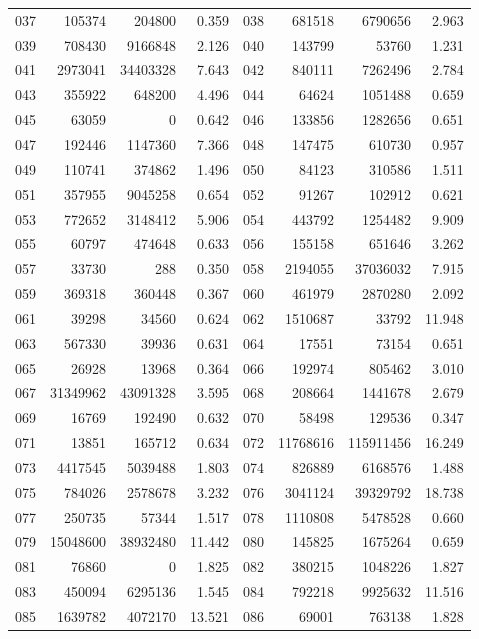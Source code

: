 \begin{longtable}{lrrr@{\hspace{16bp}}lrrr}
037 & 105374 & 204800 & 0.359 & 038 & 681518 & 6790656 & 2.963\\
039 & 708430 & 9166848 & 2.126 & 040 & 143799 & 53760 & 1.231\\
041 & 2973041 & 34403328 & 7.643 & 042 & 840111 & 7262496 & 2.784\\
043 & 355922 & 648200 & 4.496 & 044 & 64624 & 1051488 & 0.659\\
045 & 63059 & 0 & 0.642 & 046 & 133856 & 1282656 & 0.651\\
047 & 192446 & 1147360 & 7.366 & 048 & 147475 & 610730 & 0.957\\
049 & 110741 & 374862 & 1.496 & 050 & 84123 & 310586 & 1.511\\
051 & 357955 & 9045258 & 0.654 & 052 & 91267 & 102912 & 0.621\\
053 & 772652 & 3148412 & 5.906 & 054 & 443792 & 1254482 & 9.909\\
055 & 60797 & 474648 & 0.633 & 056 & 155158 & 651646 & 3.262\\
057 & 33730 & 288 & 0.350 & 058 & 2194055 & 37036032 & 7.915\\
059 & 369318 & 360448 & 0.367 & 060 & 461979 & 2870280 & 2.092\\
061 & 39298 & 34560 & 0.624 & 062 & 1510687 & 33792 & 11.948\\
063 & 567330 & 39936 & 0.631 & 064 & 17551 & 73154 & 0.651\\
065 & 26928 & 13968 & 0.364 & 066 & 192974 & 805462 & 3.010\\
067 & 31349962 & 43091328 & 3.595 & 068 & 208664 & 1441678 & 2.679\\
069 & 16769 & 192490 & 0.632 & 070 & 58498 & 129536 & 0.347\\
071 & 13851 & 165712 & 0.634 & 072 & 11768616 & 115911456 & 16.249\\
073 & 4417545 & 5039488 & 1.803 & 074 & 826889 & 6168576 & 1.488\\
075 & 784026 & 2578678 & 3.232 & 076 & 3041124 & 39329792 & 18.738\\
077 & 250735 & 57344 & 1.517 & 078 & 1110808 & 5478528 & 0.660\\
079 & 15048600 & 38932480 & 11.442 & 080 & 145825 & 1675264 & 0.659\\
081 & 76860 & 0 & 1.825 & 082 & 380215 & 1048226 & 1.827\\
083 & 450094 & 6295136 & 1.545 & 084 & 792218 & 9925632 & 11.516\\
085 & 1639782 & 4072170 & 13.521 & 086 & 69001 & 763138 & 1.828\\

\end{longtable}
